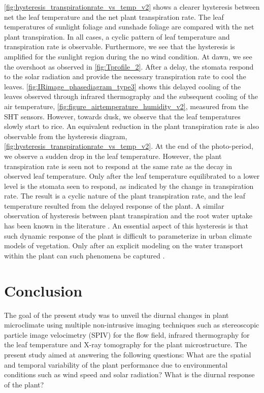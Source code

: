 \cref{fig:hysteresis_transpirationrate_vs_temp_v2} shows a clearer hysteresis between net the leaf temperature and the net plant transpiration rate. The leaf temperatures of sunlight foliage and sunshade foliage are compared with the net plant transpiration. In all cases, a cyclic pattern of leaf temperature and transpiration rate is observable. Furthermore, we see that the hysteresis is amplified for the sunlight region during the no wind condition. At dawn, we see the overshoot as observed in \cref{fig:Tprofile_2}. After a delay, the stomata respond to the solar radiation and provide the necessary transpiration rate to cool the leaves. \cref{fig:IRimage_phasediagram_type3} shows this delayed cooling of the leaves observed through infrared thermography and the subsequent cooling of the air temperature, \cref{fig:figure_airtemperature_humidity_v2}, measured from the SHT sensors. However, towards dusk, we observe that the leaf temperatures slowly start to rice. An equivalent reduction in the plant transpiration rate is also observable from the hysteresis diagram, \cref{fig:hysteresis_transpirationrate_vs_temp_v2}. At the end of the photo-period, we observe a sudden drop in the leaf temperature. However, the plant transpiration rate is seen not to respond at the same rate as the decay in observed leaf temperature. Only after the leaf temperature equilibrated to a lower level is the stomata seen to respond, as indicated by the change in transpiration rate. The result is a cyclic nature of the plant transpiration rate, and the leaf temperature resulted from the delayed response of the plant. A similar observation of hysteresis between plant transpiration and the root water uptake has been known in the literature \citep{Dauzat2001, Williams1996}. An essential aspect of this hysteresis is that such dynamic response of the plant is difficult to parameterize in urban climate models of vegetation. Only after an explicit modeling on the water transport within the plant can such phenomena be captured \citep{Huang2017, Manzoni2011}.



\section{Conclusion}

The goal of the present study was to unveil the diurnal changes in plant microclimate using multiple non-intrusive imaging techniques such as stereoscopic particle image velocimetry (SPIV) for the flow field, infrared thermography for the leaf temperature and X-ray tomography for the plant microstructure. The present study aimed at answering the following questions: What are the spatial and temporal variability of the plant performance due to environmental conditions such as wind speed and solar radiation? What is the diurnal response of the plant? 

